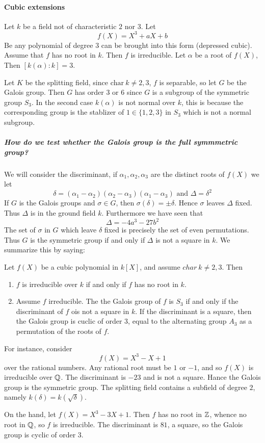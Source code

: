 \paragraph*{Cubic extensions}
\begin{example}
Let $k$ be a field not of characteristic $2$ nor $3$. Let \[
  f(X) = X^3 + aX +b  
\]
Be any polynomial of degree $3$ can be brought into this form (depressed cubic). Assume that $f$ has no root in $k$. Then $f$ is irreducible. Let $\alpha$ be a root of $f(X)$, Then $[k(\alpha)\colon k] = 3$.

Let $K$ be the splitting field, since $\text{char}~k\neq 2,3$, $f$ is separable, so let $G$ be the Galois group.
Then $G$ has order $3$ or $6$ since $G$ is a subgroup of the symmetric group $S_3$. 
In the second case $k(\alpha)$ is not normal over $k$, this is because the corresponding group is the stablizer of $1\in \{1,2,3\}$ in $S_3$ which is not a normal subgroup.%

\subparagraph*{How do we test whether the Galois group is the full symmmetric group?}
We will consider the discriminant, if $\alpha_1,\alpha_2,\alpha_3$ are the distinct roots of $f(X)$ we let\[
  \delta = (\alpha_1-\alpha_2)(\alpha_2-\alpha_3)(\alpha_1-\alpha_3) \text{ and }\Delta = \delta^2  
\]
If $G$ is the Galois groups and $\sigma\in G$, then $\sigma(\delta) = \pm \delta$. Hence $\sigma$ leaves $\Delta$ fixed. Thus $\Delta$ is in the ground field $k$. Furthermore we have seen that \[
  \Delta = -4a^3-27b^2  
\]
The set of $\sigma$ in $G$ which leave $\delta$ fixed is precisely the set of even permutations. Thus $G$ is the symmetric group if and only if $\Delta$ is not a square in $k$. We summarize this by saying:  
\begin{center}
    Let $f(X)$ be a cubic polynomial in $k[X]$, and assume  $char~k\neq 2,3$. Then \begin{enumerate}[label = (\alph*)]
    \item $f$ is irreducible over $k$ if and only if $f$ has no root in $k$.
    \item Assume $f$ irreducible. The the Galois group of  $f$ is $S_3$ if and only if the discriminant of $f$ ois not a square in $k$. If the discriminant is a square, then the Galois group is cuclic of order $3$, equal to the alternating group $A_3$ as a permutation of the roots of $f$.
\end{enumerate}
\end{center}
For instance, consider \[
    f(X) = X^3-X+1  
\]
over the rational numbers. Any rational root must be $1$ or $-1$, and so $f(X)$ is irreducible over $\mathbb{Q}$. The discriminant is $-23$ and is not a square. Hance the Galois group is the symmetric group. The splitting field contains a subfield of degree $2$, namely $k(\delta) = k(\sqrt{\delta})$.

On the hand, let $f(X) = X^3-3X+1$. Then  $f$ has no root in  $\mathbb{Z}$, whence no root in $\mathbb{Q}$, so $f$ is irreducible. The discriminant is $81$, a square, so the Galois group is cyclic of order $3$. 
\end{example}
